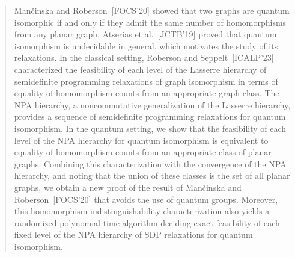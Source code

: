 \documentclass[a4paper,onecolumn,11pt,accepted=2026-01-06]{quantumarticle}
\theoremstyle{plain}
\theoremstyle{remark}
\theoremstyle{definition}
\begin{document}
\begin{abstract}

    Mančinska and Roberson~[FOCS'20] showed that two graphs are quantum isomorphic if and only if they admit the same number of homomorphisms from any planar graph. Atserias et al.~[JCTB'19] proved that quantum isomorphism is undecidable in general, which motivates the study of its relaxations. In the classical setting, Roberson and Seppelt~[ICALP'23] characterized the feasibility of each level of the Lasserre hierarchy of semidefinite programming relaxations of graph isomorphism in terms of equality of homomorphism counts from an appropriate graph class. The NPA hierarchy, a noncommutative generalization of the Lasserre hierarchy, provides a sequence of semidefinite programming relaxations for quantum isomorphism. In the quantum setting, we show that the feasibility of each level of the NPA hierarchy for quantum isomorphism is equivalent to equality of homomorphism counts from an appropriate class of planar graphs. Combining this characterization with the convergence of the NPA hierarchy, and noting that the union of these classes is the set of all planar graphs, we obtain a new proof of the result of Mančinska and Roberson~[FOCS'20] that avoids the use of quantum groups. Moreover, this homomorphism indistinguishability characterization also yields a randomized polynomial-time algorithm deciding exact feasibility of each fixed level of the NPA hierarchy of SDP relaxations for quantum isomorphism.
    
\end{abstract}
\end{document}
